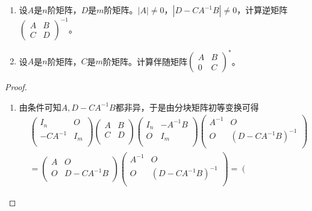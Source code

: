 \documentclass[../../main.tex]{subfiles}%
\begin{document}
\begin{example}
\begin{enumerate}
\item 设\(A\)是\(n\)阶矩阵，\(D\)是\(m\)阶矩阵。\(|A|\neq0\)，\(|D - CA^{-1}B|\neq0\)，计算逆矩阵\(\begin{pmatrix}A & B \\ C & D\end{pmatrix}^{-1}\)。

\item 设\(A\)是\(n\)阶矩阵，\(C\)是\(m\)阶矩阵。计算伴随矩阵\(\begin{pmatrix}A & B \\ 0 & C\end{pmatrix}^*\)。 
\end{enumerate}
\end{example}
\begin{proof}
\begin{enumerate}
\item 由条件可知\(A,D-CA^{-1}B\)都非异，于是由分块矩阵初等变换可得
\begin{align*}
&\left( \begin{matrix}
I_n&O\\
-CA^{-1}&I_m\\
\end{matrix} \right) 
\left( \begin{matrix}
A&B\\
C&D\\
\end{matrix} \right) 
\left( \begin{matrix}
I_n&-A^{-1}B\\
O&I_m\\
\end{matrix} \right) 
\left( \begin{matrix}
A^{-1}&O\\
O&\left( D-CA^{-1}B \right)^{-1}\\
\end{matrix} \right) 
\\
&=
\left( \begin{matrix}
A&O\\
O&D-CA^{-1}B\\
\end{matrix} \right) 
\left( \begin{matrix}
A^{-1}&O\\
O&\left( D-CA^{-1}B \right)^{-1}\\
\end{matrix} \right) 
=
\left( \begin{matrix}

\end{matrix}
\end{align*}
\end{enumerate}
\end{proof}
\end{document}
